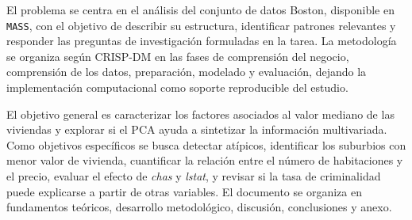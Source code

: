 El problema se centra en el an\'alisis del conjunto de datos Boston, disponible en \texttt{MASS}, con el objetivo de describir su estructura, identificar patrones relevantes y responder las preguntas de investigaci\'on formuladas en la tarea. La metodolog\'ia se organiza seg\'un CRISP-DM en las fases de comprensi\'on del negocio, comprensi\'on de los datos, preparaci\'on, modelado y evaluaci\'on, dejando la implementaci\'on computacional como soporte reproducible del estudio.

El objetivo general es caracterizar los factores asociados al valor mediano de las viviendas y explorar si el PCA ayuda a sintetizar la informaci\'on multivariada. Como objetivos espec\'ificos se busca detectar at\'ipicos, identificar los suburbios con menor valor de vivienda, cuantificar la relaci\'on entre el n\'umero de habitaciones y el precio, evaluar el efecto de \textit{chas} y \textit{lstat}, y revisar si la tasa de criminalidad puede explicarse a partir de otras variables. El documento se organiza en fundamentos te\'oricos, desarrollo metodol\'ogico, discusi\'on, conclusiones y anexo.
